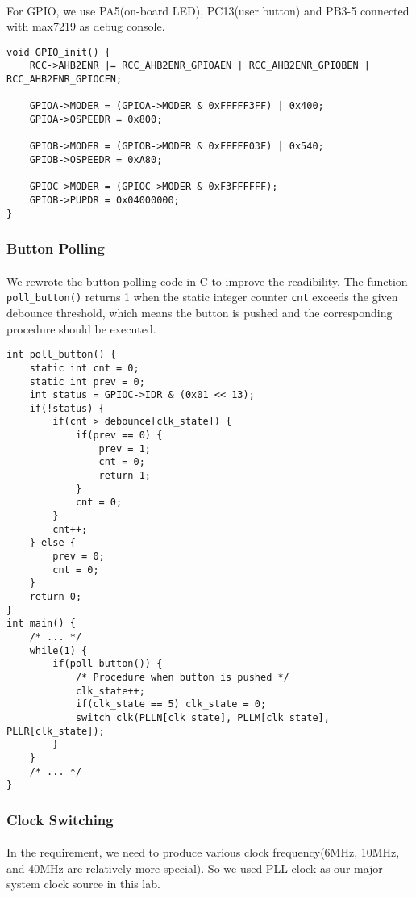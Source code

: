 \paragraph{}
For GPIO, we use PA5(on-board LED), PC13(user button) and PB3-5 connected with max7219 as debug console.
\begin{lstlisting}
void GPIO_init() {
	RCC->AHB2ENR |= RCC_AHB2ENR_GPIOAEN | RCC_AHB2ENR_GPIOBEN | RCC_AHB2ENR_GPIOCEN;

	GPIOA->MODER = (GPIOA->MODER & 0xFFFFF3FF) | 0x400;
	GPIOA->OSPEEDR = 0x800;

	GPIOB->MODER = (GPIOB->MODER & 0xFFFFF03F) | 0x540;
	GPIOB->OSPEEDR = 0xA80;

	GPIOC->MODER = (GPIOC->MODER & 0xF3FFFFFF);
	GPIOB->PUPDR = 0x04000000;
}
\end{lstlisting}
\subsubsection{Button Polling}
\paragraph{}
We rewrote the button polling code in C to improve the readibility.
The function \texttt{poll\_button()} returns 1 when the static integer counter \texttt{cnt} exceeds the given debounce threshold,
which means the button is pushed and the corresponding procedure should be executed.
\begin{lstlisting}
int poll_button() {
	static int cnt = 0;
	static int prev = 0;
	int status = GPIOC->IDR & (0x01 << 13);
	if(!status) {
		if(cnt > debounce[clk_state]) {
			if(prev == 0) {
				prev = 1;
				cnt = 0;
				return 1;
			}
			cnt = 0;
		}
		cnt++;
	} else {
		prev = 0;
		cnt = 0;
	}
	return 0;
}
int main() {
    /* ... */
	while(1) {
		if(poll_button()) {
            /* Procedure when button is pushed */
			clk_state++;
			if(clk_state == 5) clk_state = 0;
			switch_clk(PLLN[clk_state], PLLM[clk_state], PLLR[clk_state]);
		}
	}
    /* ... */
}
\end{lstlisting}
\subsubsection{Clock Switching}
\paragraph{}
In the requirement, we need to produce various clock frequency(6MHz, 10MHz, and 40MHz are relatively more special).
So we used PLL clock as our major system clock source in this lab.
